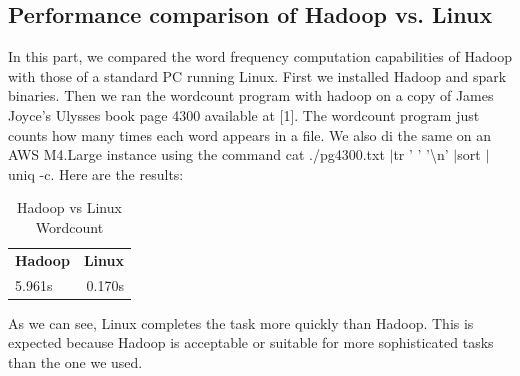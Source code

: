 \documentclass[11pt]{article}
\begin{document}
\subsection{Performance comparison of Hadoop vs. Linux}
In this part, we compared the word frequency computation capabilities of Hadoop with those of a standard PC running Linux. \newline
First we installed Hadoop and spark binaries.
Then we ran the wordcount program with hadoop on a copy of James Joyce’s Ulysses book page 4300 available at [1]. The wordcount program just counts how many times each word appears in a file. We also di the same on an AWS M4.Large instance using the command cat ./pg4300.txt $\vert $tr ' ' '\textbackslash n' $\vert $sort $\vert $uniq -c. Here are the results:
\begin{table}[h!]
    \caption{Hadoop vs Linux Wordcount}
    \label{tab:table1}
    \begin{tabular}{|l|r|}
        \hline
        \textbf{Hadoop} & \textbf{Linux}\\
        5.961s & 0.170s\\
        \hline
    \end{tabular}
\end{table}

\vspace*{0.5cm}
\noindent
As we can see, Linux completes the task more quickly than Hadoop. This is expected because Hadoop is acceptable or suitable for more sophisticated tasks than the one we used.
\end{document}
